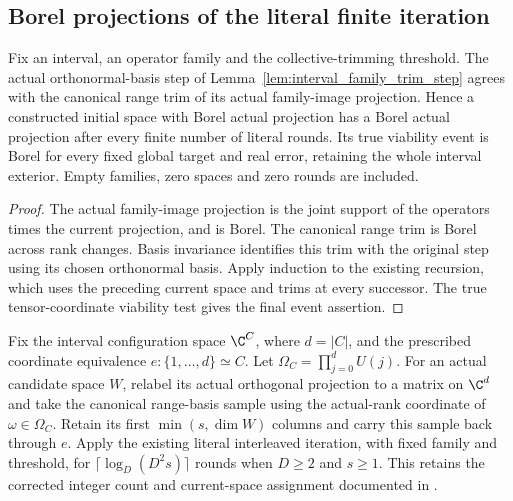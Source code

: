 \subsection{Borel projections of the literal finite iteration}

\begin{lemma}
    \label{lem:borel_literal_interval_family_trim_iterates}
    \leanok
    Fix an interval, an operator family and the collective-trimming
    threshold. The actual orthonormal-basis step of
    Lemma~\ref{lem:interval_family_trim_step} agrees with the canonical
    range trim of its actual family-image projection. Hence a constructed
    initial space with Borel actual projection has a Borel actual
    projection after every finite number of literal rounds. Its true
    viability event is Borel for every fixed global target and real
    error, retaining the whole interval exterior. Empty families, zero
    spaces and zero rounds are included.
\end{lemma}
\begin{proof}\leanok
    The actual family-image projection is the joint support of the
    operators times the current projection, and is Borel. The canonical
    range trim is Borel across rank changes. Basis invariance identifies
    this trim with the original step using its chosen orthonormal basis.
    Apply induction to the existing recursion, which uses the preceding
    current space and trims at every successor. The true tensor-coordinate
    viability test gives the final event assertion.
\end{proof}

\begin{definition}
    \label{def:canonical_sampled_interval_interleaved_parent}
    \leanok
    Fix the interval configuration space $\C^C$, where $d=|C|$, and the
    prescribed coordinate equivalence $e:\{1,\ldots,d\}\simeq C$.
    Let $\Omega_C=\prod_{j=0}^d U(j)$. For an actual candidate space $W$,
    relabel its actual orthogonal projection to a matrix on $\C^d$ and
    take the canonical range-basis sample using the actual-rank coordinate
    of $\omega\in\Omega_C$. Retain its first $\min(s,\dim W)$ columns and
    carry this sample back through $e$. Apply the existing literal
    interleaved iteration, with fixed family and threshold, for
    $\lceil\log_D(D^2s)\rceil$ rounds when $D\ge2$ and $s\ge1$.
    This retains the corrected integer count and current-space assignment
    documented in \cite{gap:alvv16_approximation_parameters}.
\end{definition}

